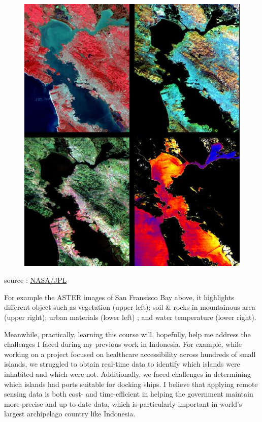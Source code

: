 \documentclass[
  letterpaper,
  DIV=11,
  numbers=noendperiod]{scrreprt}
\begin{document}
\begin{figure}

\href{https://photojournal.jpl.nasa.gov/jpegMod/PIA02605_modest.jpg}{\includegraphics{images/PIA02605_modest.jpg}}

\end{figure}

source :
\href{https://photojournal.jpl.nasa.gov/catalog/PIA02605}{NASA/JPL}

For example the ASTER images of San Fransisco Bay above, it highlights
different object such as vegetation (upper left); soil \& rocks in
mountainous area (upper right); urban materials (lower left) ; and water
temperature (lower right).

Meanwhile, practically, learning this course will, hopefully, help me
address the challenges I faced during my previous work in Indonesia. For
example, while working on a project focused on healthcare accessibility
across hundreds of small islands, we struggled to obtain real-time data
to identify which islands were inhabited and which were not.
Additionally, we faced challenges in determining which islands had ports
suitable for docking ships. I believe that applying remote sensing data
is both cost- and time-efficient in helping the government maintain more
precise and up-to-date data, which is particularly important in world's
largest archipelago country like Indonesia.
\end{document}

